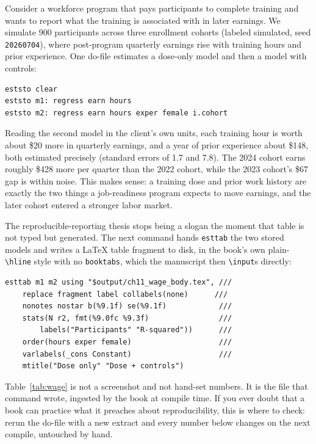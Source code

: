 \documentclass[
    a4paper,
    fontsize=10pt,
    twoside=true,
    numbers=noenddot,
]{kaobook}
\begin{document}
Consider a workforce program that pays participants to complete training and wants to report what the training is associated with in later earnings. We simulate 900 participants across three enrollment cohorts (labeled simulated, seed \texttt{20260704}), where post-program quarterly earnings rise with training hours and prior experience. One do-file estimates a dose-only model and then a model with controls:
{\footnotesize
\begin{verbatim}
eststo clear
eststo m1: regress earn hours
eststo m2: regress earn hours exper female i.cohort
\end{verbatim}
}
Reading the second model in the client's own units, each training hour is worth about \$20 more in quarterly earnings, and a year of prior experience about \$148, both estimated precisely (standard errors of 1.7 and 7.8). The 2024 cohort earns roughly \$428 more per quarter than the 2022 cohort, while the 2023 cohort's \$67 gap is within noise. This makes sense: a training dose and prior work history are exactly the two things a job-readiness program expects to move earnings, and the later cohort entered a stronger labor market.

The reproducible-reporting thesis stops being a slogan the moment that table is not typed but generated. The next command hands \texttt{esttab} the two stored models and writes a \LaTeX{} table fragment to disk, in the book's own plain-\texttt{\textbackslash hline} style with no \texttt{booktabs}, which the manuscript then \texttt{\textbackslash input}s directly:
{\footnotesize
\begin{verbatim}
esttab m1 m2 using "$output/ch11_wage_body.tex", ///
    replace fragment label collabels(none)      ///
    nonotes nostar b(%9.1f) se(%9.1f)            ///
    stats(N r2, fmt(%9.0fc %9.3f)                ///
        labels("Participants" "R-squared"))      ///
    order(hours exper female)                    ///
    varlabels(_cons Constant)                    ///
    mtitle("Dose only" "Dose + controls")
\end{verbatim}
}
Table~\ref{tab:wage} is not a screenshot and not hand-set numbers. It is the file that command wrote, ingested by the book at compile time. If you ever doubt that a book can practice what it preaches about reproducibility, this is where to check: rerun the do-file with a new extract and every number below changes on the next compile, untouched by hand.
\end{document}
